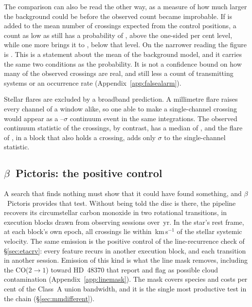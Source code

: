 The comparison can also be read the other way, as a measure of how much
larger the background could be before the observed count became improbable.
If \CeAddLim{} is added to the mean number of crossings expected from the
control positions, a count as low as \CeObs{} still has a probability of
\CeProbAtLim, above the one-sided \CeAlphaPct{} per cent level, while one
more brings it to \CeProbAboveLim, below that level. On the narrower
reading the figure is \FrNarrowAddLim. This is a statement about the mean of
the background model, and it carries the same two conditions as the
probability. It is not a confidence bound on how many of the observed
crossings are real, and still less a count of transmitting systems or an
occurrence rate (Appendix~\ref{app:falsealarm}).

Stellar flares are excluded by a broadband prediction. A millimetre flare
raises every channel of a window alike, so one able to make a single-channel
crossing would appear as a \FlPredLo--\FlPredHi$\sigma$ continuum event in
the same integrations. The observed continuum statistic of the crossings, by
contrast, has a median of \FlObsMed, and the \FlEgStar{} flare of
\citet{MacGregor2020}, in a block that also holds a crossing, adds only
\FlEgContrib$\sigma$ to the single-channel statistic.

\subsection{$\beta$~Pictoris: the positive control}
\label{sec:bpicval}

A search that finds nothing must show that it could have found something,
and $\beta$~Pictoris provides that test. Without being told the disc is
there, the pipeline recovers its circumstellar carbon monoxide
\citep{Dent2014,Matra2017} in two rotational transitions, in
\CsBpCoBlocks{} execution blocks drawn from \CsBpCoSess{} observing sessions
over \BpBaselineYr\,yr. In the star's rest frame, at each block's own epoch,
all \BpicPanelNCo{} crossings lie within \BpicDvCoHi\,km\,s$^{-1}$ of the
stellar systemic velocity. The same emission is the positive control of the
line-recurrence check of \S\ref{sec:etacrv}: every feature recurs in another
execution block, and each transition in another session. Emission of this
kind is what the line mask removes, including the CO($2{\to}1$) toward
HD~48370 that \citet{Cataldi2023} report and flag as possible cloud
contamination (Appendix~\ref{app:linemask}). The mask covers \FrNSpec{}
species and costs \MkMaskAPct{} per cent of the Class~A union bandwidth, and
it is the single most productive test in the chain
(\S\ref{sec:mmdifferent}).


